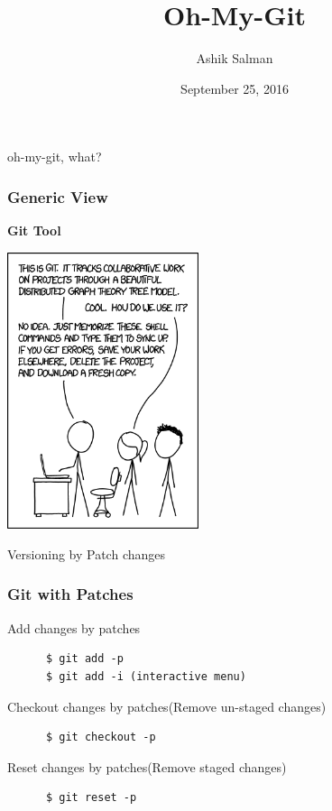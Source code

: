 \documentclass[10pt]{beamer}
\title{Oh-My-Git}
\author{Ashik Salman}
\institute[UMBC]{Awesome Git tweaks \\
  ..... \\
  Backend Developer \\
  Chillr, Backwater Technologies \\
  Kochi, Kerala \\

}
\date{September 25, 2016}
\begin{document}

\begin{frame}[plain]
  \titlepage
\end{frame}
	
\begin{frame}
  \begin{center}
    \Huge{oh-my-git, what?}
  \end{center}
\end{frame}

\begin{frame}
	\frametitle{Generic View}
	\textbf{Git Tool}
	\begin{center}
	\includegraphics[width=0.42\textwidth]{git-xkcd.png}
	\end{center}
\end{frame}

\begin{frame}
  \begin{center}
    \Huge{Versioning by Patch changes}
  \end{center}
\end{frame}

\begin{frame}[fragile]
  \frametitle{Git with Patches}
  \begin{block}{Add changes by patches}
    \begin{verbatim}
      $ git add -p
      $ git add -i (interactive menu)
    \end{verbatim}
  \end{block}
  \pause
  \begin{block}{Checkout changes by patches(Remove un-staged changes)}
    \begin{verbatim}
      $ git checkout -p
    \end{verbatim}
  \end{block}
  \pause
  \begin{block}{Reset changes by patches(Remove staged changes)}
    \begin{verbatim}
      $ git reset -p
    \end{verbatim}
  \end{block}
\end{frame}
\end{document}
